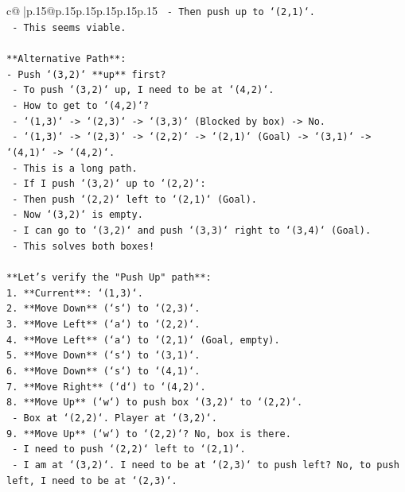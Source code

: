 \documentclass{article}
\begin{document}
{\begin{supertabular}{c@{$\;$}|p{.15\linewidth}@{}p{.15\linewidth}p{.15\linewidth}p{.15\linewidth}p{.15\linewidth}p{.15\linewidth}}
{{{\texttt{         {-} Then push up to `(2,1)`.} \\
\texttt{       {-} This seems viable.} \\
\\ 
\texttt{**Alternative Path**:} \\
\texttt{{-} Push `(3,2)` **up** first?} \\
\texttt{  {-} To push `(3,2)` up, I need to be at `(4,2)`.} \\
\texttt{  {-} How to get to `(4,2)`?} \\
\texttt{    {-} `(1,3)` {-}> `(2,3)` {-}> `(3,3)` (Blocked by box) {-}> No.} \\
\texttt{    {-} `(1,3)` {-}> `(2,3)` {-}> `(2,2)` {-}> `(2,1)` (Goal) {-}> `(3,1)` {-}> `(4,1)` {-}> `(4,2)`.} \\
\texttt{    {-} This is a long path.} \\
\texttt{  {-} If I push `(3,2)` up to `(2,2)`:} \\
\texttt{    {-} Then push `(2,2)` left to `(2,1)` (Goal).} \\
\texttt{    {-} Now `(3,2)` is empty.} \\
\texttt{    {-} I can go to `(3,2)` and push `(3,3)` right to `(3,4)` (Goal).} \\
\texttt{    {-} This solves both boxes!} \\
\\ 
\texttt{**Let's verify the "Push Up" path**:} \\
\texttt{1. **Current**: `(1,3)`.} \\
\texttt{2. **Move Down** (`s`) to `(2,3)`.} \\
\texttt{3. **Move Left** (`a`) to `(2,2)`.} \\
\texttt{4. **Move Left** (`a`) to `(2,1)` (Goal, empty).} \\
\texttt{5. **Move Down** (`s`) to `(3,1)`.} \\
\texttt{6. **Move Down** (`s`) to `(4,1)`.} \\
\texttt{7. **Move Right** (`d`) to `(4,2)`.} \\
\texttt{8. **Move Up** (`w`) to push box `(3,2)` to `(2,2)`.} \\
\texttt{   {-} Box at `(2,2)`. Player at `(3,2)`.} \\
\texttt{9. **Move Up** (`w`) to `(2,2)`? No, box is there.} \\
\texttt{   {-} I need to push `(2,2)` left to `(2,1)`.} \\
\texttt{   {-} I am at `(3,2)`. I need to be at `(2,3)` to push left? No, to push left, I need to be at `(2,3)`.} \\
}}}
\end{supertabular}}
\end{document}
